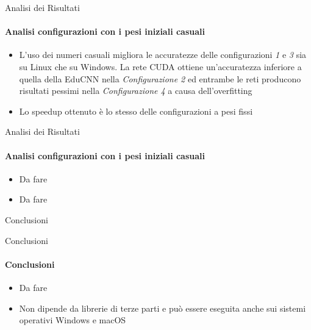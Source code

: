 \documentclass[
 ]{beamer}
\begin{document}
\begin{frame}{Analisi dei Risultati}
    \framesubtitle{Analisi configurazioni con i pesi iniziali casuali}
    \smallskip
    \begin{itemize} [<+->]
        \setlength\itemsep{2em}
        \item \large L'uso dei numeri casuali migliora le accuratezze delle configurazioni \emph{1} e \emph{3} sia su Linux che su Windows. La rete CUDA ottiene un'accuratezza inferiore a quella della EduCNN nella \emph{Configurazione 2} ed entrambe le reti producono risultati pessimi nella \emph{Configurazione 4} a causa dell'overfitting
        \item \large Lo speedup ottenuto è lo stesso delle configurazioni a pesi fissi
    \end{itemize}     
\end{frame}

\begin{frame}{Analisi dei Risultati}
    \framesubtitle{Analisi configurazioni con i pesi iniziali casuali}
    \smallskip
    \begin{itemize} [<+->]
        \setlength\itemsep{2em}
        \item \large Da fare %
        \item \large Da fare %
    \end{itemize}     
\end{frame}

\begin{frame}[c]
  \centering
  \bigskip \bigskip    
  \Huge Conclusioni
\end{frame}

\begin{frame}{Conclusioni}
    \framesubtitle{Conclusioni}
    \smallskip
    \begin{itemize} [<+->]
        \setlength\itemsep{3em}
        \item \large Da fare
        \item \large Non dipende da librerie di terze parti e può essere eseguita anche sui sistemi operativi Windows e macOS
    \end{itemize}     
\end{frame}
\end{document}
